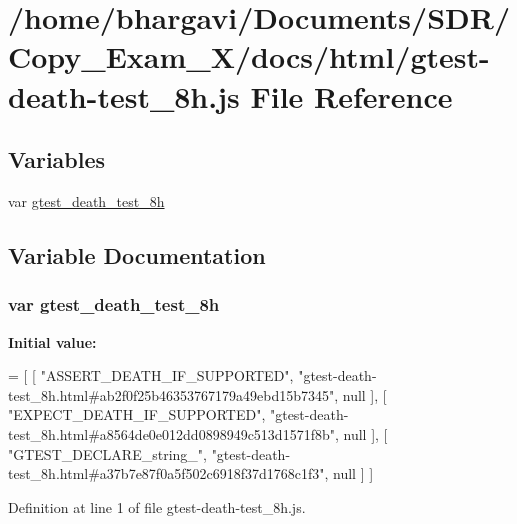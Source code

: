 \hypertarget{gtest-death-test__8h_8js}{}\section{/home/bhargavi/\+Documents/\+S\+D\+R/\+Copy\+\_\+\+Exam\+\_\+X/docs/html/gtest-\/death-\/test\+\_\+8h.js File Reference}
\label{gtest-death-test__8h_8js}
\subsection*{Variables}
\begin{DoxyCompactItemize}
\item 
var \hyperlink{gtest-death-test__8h_8js_a04fa4225a2e049e6bdb588c227358d79}{gtest\+\_\+death\+\_\+test\+\_\+8h}
\end{DoxyCompactItemize}


\subsection{Variable Documentation}
\subsubsection[{\texorpdfstring{gtest\+\_\+death\+\_\+test\+\_\+8h}{gtest_death_test_8h}}]{\setlength{\rightskip}{0pt plus 5cm}var gtest\+\_\+death\+\_\+test\+\_\+8h}\hypertarget{gtest-death-test__8h_8js_a04fa4225a2e049e6bdb588c227358d79}{}\label{gtest-death-test__8h_8js_a04fa4225a2e049e6bdb588c227358d79}
{\bfseries Initial value\+:}
\begin{DoxyCode}
=
[
    [ \textcolor{stringliteral}{"ASSERT\_DEATH\_IF\_SUPPORTED"}, \textcolor{stringliteral}{"gtest-death-test\_8h.html#ab2f0f25b46353767179a49ebd15b7345"}, null ],
    [ \textcolor{stringliteral}{"EXPECT\_DEATH\_IF\_SUPPORTED"}, \textcolor{stringliteral}{"gtest-death-test\_8h.html#a8564de0e012dd0898949c513d1571f8b"}, null ],
    [ \textcolor{stringliteral}{"GTEST\_DECLARE\_string\_"}, \textcolor{stringliteral}{"gtest-death-test\_8h.html#a37b7e87f0a5f502c6918f37d1768c1f3"}, null ]
]
\end{DoxyCode}


Definition at line 1 of file gtest-\/death-\/test\+\_\+8h.\+js.

